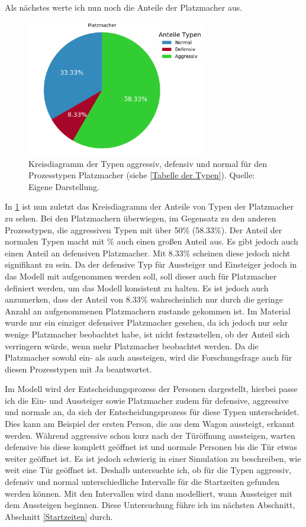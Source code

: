 Als nächstes werte ich nun noch die Anteile der Platzmacher aus.
\begin{figure}[H]
	\centering
		\includegraphics[width=0.7\textwidth]{pictures/data_evaluation/types/proportions_Platzmacher.png}
	\caption{Kreisdiagramm der Typen aggressiv, defensiv und normal für den Prozesstypen Platzmacher (siehe \ref{Tabelle der Typen}). Quelle: Eigene Darstellung.}
	\label{fig:AnteileTypenPlatzmacher}
\end{figure}
In \figurename \ref{fig:AnteileTypenPlatzmacher} ist nun zuletzt das Kreisdiagramm der Anteile von Typen der Platzmacher zu sehen. Bei den Platzmachern überwiegen, im Gegensatz zu den anderen Prozesstypen, die aggressiven Typen mit über 50\% (58.33\%). Der Anteil der normalen Typen macht mit \%  auch einen großen Anteil aus. Es gibt jedoch auch einen Anteil an defensiven Platzmacher. Mit 8.33\% scheinen diese jedoch nicht signifikant zu sein. Da der defensive Typ für Aussteiger und Einsteiger jedoch in das Modell mit aufgenommen werden soll, soll dieser auch für Platzmacher definiert werden, um das Modell konsistent zu halten. Es ist jedoch auch anzumerken, dass der Anteil von 8.33\% wahrscheinlich nur durch die geringe Anzahl an aufgenommenen Platzmachern zustande gekommen ist. Im Material wurde nur ein einziger defensiver Platzmacher gesehen, da ich jedoch nur sehr wenige Platzmacher beobachtet habe, ist nicht festzustellen, ob der Anteil sich verringern würde, wenn mehr Platzmacher beobachtet werden. Da die Platzmacher sowohl ein- als auch aussteigen, wird die Forschungsfrage auch für diesen Prozesstypen mit Ja beantwortet. 

Im Modell wird der Entscheidungsprozess der Personen dargestellt, hierbei passe ich die Ein- und Aussteiger sowie Platzmacher zudem für defensive, aggressive und normale an, da sich der Entscheidungsprozess für diese Typen unterscheidet. Dies kann am Beispiel der ersten Person, die aus dem Wagon aussteigt, erkannt werden. Während aggressive schon kurz nach der Türöffnung aussteigen, warten defensive bis diese komplett geöffnet ist und normale Personen bis die Tür etwas weiter geöffnet ist. Es ist jedoch schwierig in einer Simulation zu beschreiben, wie weit eine Tür geöffnet ist. Deshalb untersuchte ich, ob für die Typen aggressiv, defensiv und normal unterschiedliche Intervalle für die Startzeiten gefunden werden können. Mit den Intervallen wird dann modelliert, wann Aussteiger mit dem Aussteigen beginnen. Diese Untersuchung führe ich im nächsten Abschnitt, Abschnitt \ref{Startzeiten} durch.

